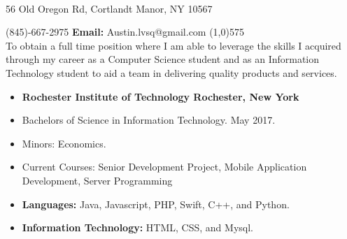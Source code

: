 \documentclass[10pt]{article}
\begin{document}
\begin{center}
\\
\vspace{.3ex}
56 Old Oregon Rd, Cortlandt Manor, NY 10567
\end{center}
 (845)-667-2975 \hfill {\bf Email:} Austin.lvsq@gmail.com
\line(1,0){575}\\

To obtain a full time position where I am able to leverage the skills I acquired through my career as a Computer Science student and as an Information Technology student to aid a team in delivering quality products and services.
\vspace{.75ex}\\
\begin{itemize}[topsep=1ex, itemsep=.25ex, partopsep=0ex, parsep=0ex]
	\item[]{{\bf Rochester Institute of Technology \hfill Rochester, New York}}
  \item[] Bachelors of Science in Information Technology. \hfill May 2017.
  \item[] Minors: Economics.
  \item[] {Current Courses:} Senior Development Project, Mobile Application Development, Server Programming
\end{itemize}
\vspace{1ex}
\begin{itemize} [topsep=1ex, itemsep=.25ex, partopsep=0ex, parsep=0ex]
	\item[] {\bf Languages:} Java, Javascript, PHP, Swift, C++, and Python.
 	\item[] {\bf Information Technology:} HTML, CSS, and Mysql.
\end{itemize}
\vspace{.75ex}
\end{document}
